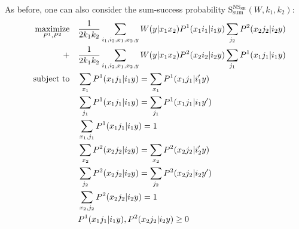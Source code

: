 As before, one can also consider the sum-success probability $\mathrm{S}_{\text{sum}}^{\mathrm{NS}_{\mathrm{SR}}}(W,k_1,k_2)$:
\begin{equation}
  \begin{aligned}
    &&\underset{P^1, P^2}{\operatorname{\text{maximize}}} &&& \frac{1}{2k_1k_2} \sum_{i_1,i_2,x_1,x_2,y} W(y|x_1x_2)P^1(x_1i_1|i_1y)\sum_{j_2}P^2(x_2j_2|i_2y)\\
    &&+&&& \frac{1}{2k_1k_2} \sum_{i_1,i_2,x_1,x_2,y} W(y|x_1x_2)P^2(x_2i_2|i_2y)\sum_{j_1}P^1(x_1j_1|i_1y)\\
    &&\operatorname{\text{subject to}} &&& \sum_{x_1} P^1(x_1j_1|i_1y) = \sum_{x_1} P^1(x_1j_1|i_1'y)\\
    &&&&& \sum_{j_1} P^1(x_1j_1|i_1y) = \sum_{j_1} P^1(x_1j_1|i_1y')\\
    &&&&& \sum_{x_1,j_1} P^1(x_1j_1|i_1y) = 1\\
    &&&&& \sum_{x_2} P^2(x_2j_2|i_2y) = \sum_{x_2} P^2(x_2j_2|i_2'y)\\
    &&&&& \sum_{j_2} P^2(x_2j_2|i_2y) = \sum_{j_2} P^2(x_2j_2|i_2y')\\
    &&&&& \sum_{x_2,j_2} P^2(x_2j_2|i_2y) = 1\\
    &&&&& P^1(x_1j_1|i_1y), P^2(x_2j_2|i_2y) \geq 0
  \end{aligned}
\end{equation}

%

